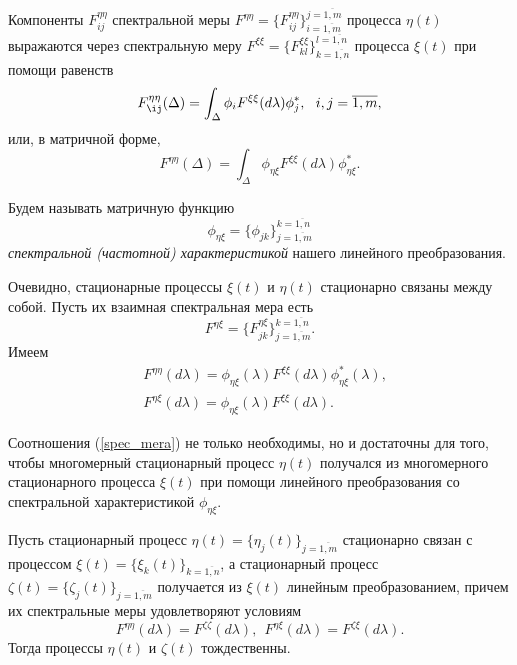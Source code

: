  Компоненты $F^{\eta\eta}_{ij}$ спектральной меры $F^{\eta\eta} = \{F^{\eta\eta}_{ij}\}^{j=\overline{1,m}}_{i=\overline{1,m}}$ процесса $\eta(t)$ выражаются через спектральную меру $F^{\xi\xi} = \{F^{\xi\xi}_{kl}\}^{l=\overline{1,n}}_{k=\overline{1,n}}$ процесса $\xi(t)$ при помощи равенств \begin{equation} 
	F^{\eta\eta}_{\ij}(\Delta) = \int_{\Delta} \phi_i F^{\xi\xi}(d \lambda) \phi^{*}_j, \ \ i,j=\overline{1, m}, 
\end{equation} 
или, в матричной форме, 
\begin{equation} 
	F^{\eta\eta}(\Delta) = \int_{\Delta} \phi_{\eta\xi}F^{\xi\xi}(d \lambda) \phi^{*}_{\eta\xi}. 
\end{equation}

 Будем называть матричную функцию 
\begin{equation} 
	\phi_{\eta\xi} = \{\phi_{jk}\}^{k=\overline{1,n}}_{j=\overline{1,m}} 
\end{equation} 
\emph{спектральной (частотной) характеристикой} нашего линейного преобразования.

 Очевидно, стационарные процессы $\xi(t)$ и $\eta(t)$ стационарно связаны между собой. Пусть их взаимная спектральная мера есть 
\begin{equation} 
	F^{\eta\xi} = \{F^{\eta\xi}_{jk}\}^{k=\overline{1,n}}_{j=\overline{1,m}}. 
\end{equation} 
Имеем
\begin{equation}
\label{spec_mera}
\begin{split}
    & F^{\eta\eta}(d \lambda) = \phi_{\eta\xi}(\lambda)F^{\xi\xi}(d \lambda)\phi^{*}_{\eta\xi}(\lambda), \\
    & F^{\eta\xi}(d \lambda) = \phi_{\eta\xi}(\lambda)F^{\xi\xi}(d \lambda).
\end{split}
\end{equation}

 Соотношения (\ref{spec_mera}) не только необходимы, но и достаточны для того, чтобы многомерный стационарный процесс $\eta(t)$ получался из многомерного стационарного процесса $\xi(t)$ при помощи линейного преобразования со спектральной характеристикой $\phi_{\eta\xi}$.

\begin{lemma}\label{hellopuza_lemma_3.1} Пусть стационарный процесс $\eta(t) = \{\eta_j(t)\}_{j=\overline{1,m}}$ стационарно связан с процессом $\xi(t) = \{\xi_k(t)\}_{k=\overline{1,n}}$, а стационарный процесс $\zeta(t) = \{\zeta_j(t)\}_{j=\overline{1,m}}$ получается из $\xi(t)$ линейным преобразованием, причем их спектральные меры удовлетворяют условиям 
	\begin{equation} 
		\label{spec_usl} F^{\eta\eta}(d \lambda) = F^{\zeta\zeta}(d \lambda), \ \ F^{\eta\xi}(d \lambda) = F^{\zeta\xi}(d \lambda). 
	\end{equation} 
Тогда процессы $\eta(t)$ и $\zeta(t)$ тождественны.
	
\end{lemma}


